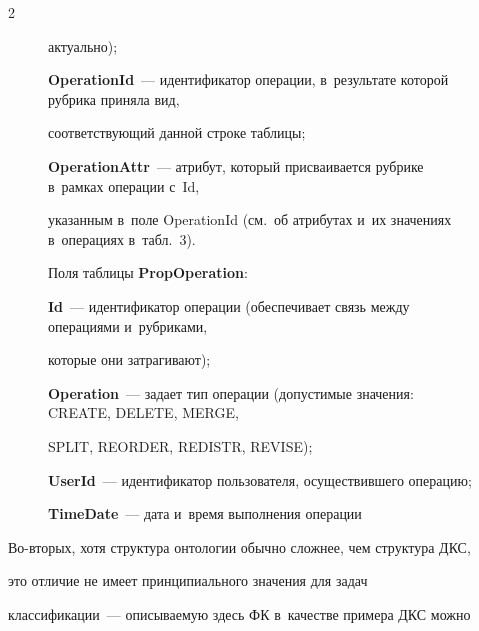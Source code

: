\begin{multicols}{2}
\begin{figure}[b]
{актуально);




\textbf{OperationId}~--- идентификатор операции, в~результате которой рубрика приняла вид, 


соответствующий данной строке таблицы;




\textbf{OperationAttr}~--- атрибут, который присваивается рубрике в~рамках операции с~Id, 


указанным в~поле OperationId (см.\ об атрибутах и~их значениях в~операциях в~табл.~3).




Поля таблицы \textbf{PropOperation}:






\textbf{Id}~--- идентификатор операции (обеспечивает связь между операциями и~рубриками, 


которые они затрагивают);




\textbf{Operation}~--- задает тип операции (допустимые значения: CREATE, DELETE, MERGE, 


SPLIT, REORDER, REDISTR, REVISE);




\textbf{UserId}~--- идентификатор пользователя, осуществившего операцию;




\textbf{TimeDate}~--- дата и~время выполнения операции




}


\end{figure}





Во-вто\-рых, хотя структура онтологии обычно сложнее, чем структура ДКС, 


это отличие не имеет принципиального значения для задач  


классификации~--- описываемую здесь ФК в~качестве примера ДКС можно 



\end{multicols}
